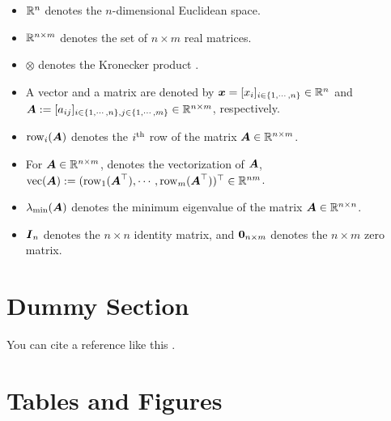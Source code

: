 \documentclass[lettersize,journal]{IEEEtran}
\begin{document}
\begin{itemize}
    \item $\mathbb{R}^n$ denotes the $n$-dimensional Euclidean space.
    \item $\mathbb{R}^{n\times m}$ denotes the set of $n\times m$ real matrices.
    \item $\otimes$ denotes the Kronecker product \cite[Chap. 7 Def. 7.1.2]{Bernstein:2009aa}.
    \item A vector and a matrix are denoted by $\boldsymbol{x}=[x_i]_{i\in\{1,\cdots,n\}}\in\mathbb{R}^n$ and $
        \boldsymbol{A}
        := 
        [a_{ij}]
        _{
            i\in\{1,\cdots,n\},j\in\{1,\cdots ,m\}
        }\allowbreak\in\mathbb{R}^{n\times m}
        $, respectively.
    \item $\operatorname{row}_i(\boldsymbol{A})$ denotes the $i\textsuperscript{th}$ row of the matrix $\boldsymbol{A}\in\mathbb{R}^{n\times m}$. 
    \item For $\boldsymbol{A}\in\mathbb{R}^{n\times m}$, denotes the vectorization of $\boldsymbol{A}$, $\operatorname{vec}(\boldsymbol{A}):=(\operatorname{row}_1(\boldsymbol{A}^\top),\cdots,\operatorname{row}_m(\boldsymbol{A}^\top)  )^\top\in\mathbb{R}^{nm}$.
    \item $\lambda_{\min}(\boldsymbol{A})$ denotes the minimum eigenvalue of the matrix $\boldsymbol{A}\in\mathbb{R}^{n\times n}$.
    \item $\boldsymbol{I}_n$ denotes the $n\times n$ identity matrix, and $\boldsymbol{0}_{n\times m}$ denotes the $n\times m$ zero matrix.
\end{itemize}

\section{Dummy Section}

You can cite a reference like this \cite{Ryu:2024aa}.

\lipsum[1-3]

\section{Tables and Figures}
\end{document}
